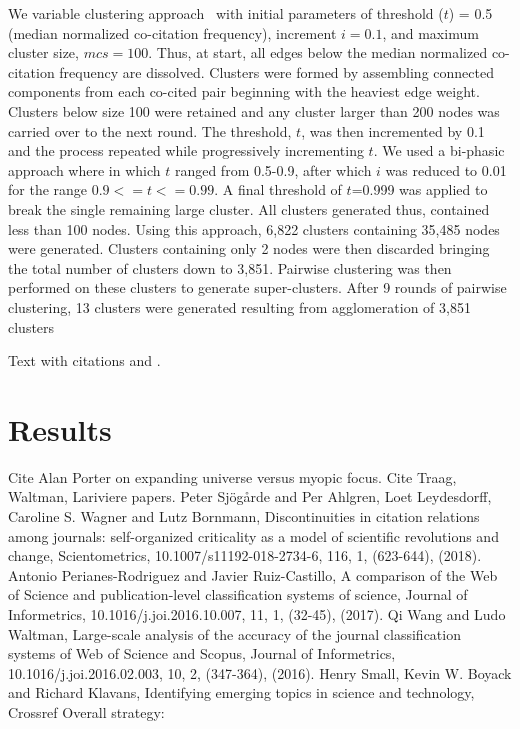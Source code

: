 We variable clustering approach~\cite{small_clustering_1985} with initial parameters of threshold ($t$) = 0.5 (median normalized co-citation frequency), increment $i = 0.1$, and maximum cluster size, $mcs = 100$. Thus, at start, all edges below the median normalized co-citation frequency are dissolved. Clusters were formed by assembling connected components from each co-cited pair beginning with the heaviest edge weight. Clusters below size 100 were retained and any cluster larger than 200 nodes was carried over to the next round. The threshold, $t$, was then incremented by 0.1 and the process repeated while progressively incrementing $t$.  We used a bi-phasic approach where in which $t$ ranged from 0.5-0.9, after which $i$ was reduced to 0.01 for the range $0.9 <= t <= 0.99$. A final threshold of $t$=0.999 was applied to break the single remaining large cluster. All clusters generated thus, contained  less than 100 nodes.  Using this approach, 6,822 clusters containing 35,485 nodes were generated. Clusters containing only 2 nodes were then discarded bringing the total number of clusters down to 3,851. Pairwise clustering was then performed on these clusters to generate super-clusters. After 9 rounds of pairwise clustering, 13 clusters were generated resulting from agglomeration of 3,851 clusters 

\label{sec:1}
Text with citations \cite{RefB} and \cite{RefJ}.

\section{Results}
\label{sec:2}

Cite Alan Porter on expanding universe versus myopic focus. Cite Traag, Waltman, Lariviere papers. Peter Sjögårde and Per Ahlgren, Loet Leydesdorff, Caroline S. Wagner and Lutz Bornmann, Discontinuities in citation relations among journals: self-organized criticality as a model of scientific revolutions and change, Scientometrics, 10.1007/s11192-018-2734-6, 116, 1, (623-644), (2018). Antonio Perianes-Rodriguez and Javier Ruiz-Castillo, A comparison of the Web of Science and publication-level classification systems of science, Journal of Informetrics, 10.1016/j.joi.2016.10.007, 11, 1, (32-45), (2017). Qi Wang and Ludo Waltman, Large-scale analysis of the accuracy of the journal classification systems of Web of Science and Scopus, Journal of Informetrics, 10.1016/j.joi.2016.02.003, 10, 2, (347-364), (2016). Henry Small, Kevin W. Boyack and Richard Klavans, Identifying emerging topics in science and technology, 
Crossref
Overall strategy:

